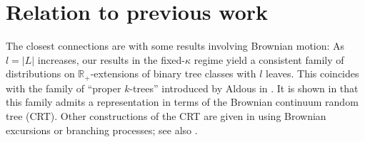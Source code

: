 \documentclass[11pt]{article}
\begin{document}
%
%
%
%
%
%
\section{Relation to previous work}
The closest connections are with some results involving Brownian motion:
As $l=|L|$ increases, our results in the fixed-$\kappa$ regime yield a consistent
family of distributions on $\mathbb R_+$-extensions of binary tree classes with
$l$ leaves. This coincides with the family of ``proper $k$-trees'' introduced by
Aldous in \cite[\S4.3]{A3}. It is shown in \cite{A3} that this family admits a
representation in terms of the Brownian continuum random tree (CRT). Other
constructions of the CRT are given in \cite{A1,A2} using Brownian excursions or
branching processes; see also \cite{NP1,NP2,LG}.
\end{document}
